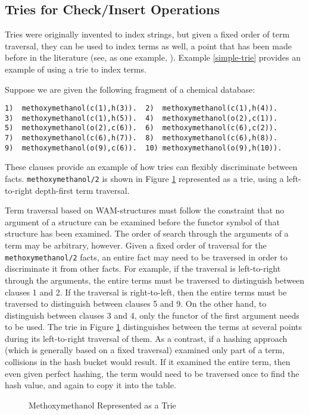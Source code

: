 \subsection{Tries for Check/Insert Operations}\label{trie-over}

Tries were originally invented to index strings, but given a fixed
order of term traversal, they can be used to index terms as well, a
point that has been made before in the literature (see, as one
example, \cite{CRR92}).  Example \ref{simple-trie} provides an example
of using a trie to index terms.

\begin{example} \rm \label{simple-trie}

Suppose we are given the following fragment of a chemical database:

\begin{verbatim} 
1)  methoxymethanol(c(1),h(3)).  2)  methoxymethanol(c(1),h(4)).
3)  methoxymethanol(c(1),h(5)).  4)  methoxymethanol(o(2),c(1)).
5)  methoxymethanol(o(2),c(6)).  6)  methoxymethanol(c(6),c(2)).
7)  methoxymethanol(c(6),h(7)).  8)  methoxymethanol(c(6),h(8)).
9)  methoxymethanol(o(9),c(6)).  10) methoxymethanol(o(9),h(10)).
\end{verbatim}

These clauses provide an example of how tries can flexibly
discriminate between facts.  {\tt methoxymethanol/2} is shown in
Figure \ref{abstract-trie.eps} represented as a trie, using a
left-to-right depth-first term traversal.

Term traversal based on WAM-structures must follow the constraint that
no argument of a structure can be examined before the functor symbol
of that structure has been examined.  The order of search through the
arguments of a term may be arbitrary, however.  Given a fixed order of
traversal for the {\tt methoxymethanol/2} facts, an entire fact may
need to be traversed in order to discriminate it from other facts.
For example, if the traversal is left-to-right through the arguments,
the entire terms must be traversed to distinguish between clauses 1
and 2.  If the traversal is right-to-left, then the entire terms must
be traversed to distinguish between clauses 5 and 9.  On the other
hand, to distinguish between clauses 3 and 4, only the functor of the
first argument needs to be used.  The trie in Figure
\ref{abstract-trie.eps} distinguishes between the terms at several
points during its left-to-right traversal of them.  As a contrast, if
a hashing approach (which is generally based on a fixed traversal)
examined only part of a term, collisions in the hash bucket would
result.  If it examined the entire term, then even given perfect
hashing, the term would need to be traversed once to find the hash
value, and again to copy it into the table.

\begin{figure}[htbp]
\mbox{}
\caption{Methoxymethanol Represented as a Trie}\label{abstract-trie.eps}
\end{figure}
\end{example}

